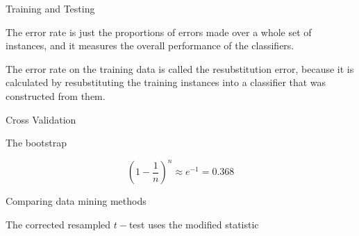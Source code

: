 

Training and Testing

The error rate is just the proportions of errors made over a whole set of instances, and
it measures the overall performance of the classifiers.


The error rate on the training data is called the resubstitution error, because it is calculated
by resubstituting the training instances into a classifier that was constructed from them.

Cross Validation




The bootstrap

\[ \left( 1 - \frac{1}{n}\right)^n \approx e^{-1} = 0.368\]


Comparing data mining methods


The corrected resampled $t-$test uses the modified statistic

